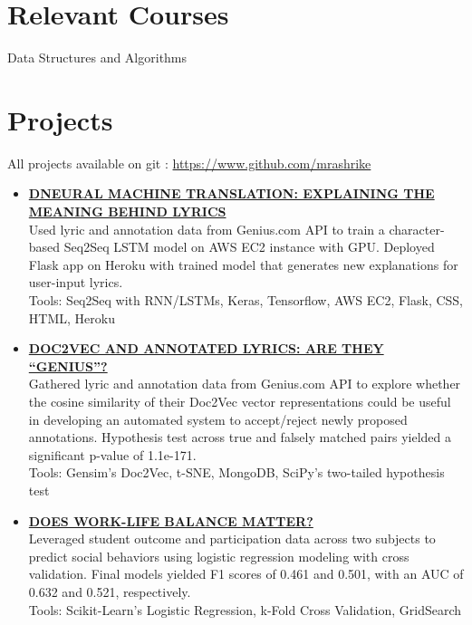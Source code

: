 \documentclass[margin, centered]{res}
\begin{document}
\begin{resume}



\section{Relevant \hspace{2mm} Courses}
Data Structures and Algorithms 

\section{Projects}
All projects available on git : \url{https://www.github.com/mrashrike}
\begin{itemize}[leftmargin=*]
 \item \textbf{\href{https://github.com/}{DNEURAL MACHINE TRANSLATION: EXPLAINING THE MEANING BEHIND LYRICS}} \\
 Used lyric and annotation data from Genius.com API to train a character-based Seq2Seq LSTM model on AWS EC2 instance with GPU. Deployed Flask app on Heroku with trained model that generates new explanations for user-input lyrics. \\
 Tools: Seq2Seq with RNN/LSTMs, Keras, Tensorflow, AWS EC2, Flask, CSS, HTML, Heroku
 \item \textbf{\href{https://github.com/}{DOC2VEC AND ANNOTATED LYRICS: ARE THEY “GENIUS”?}} \\
 Gathered lyric and annotation data from Genius.com API to explore whether the cosine similarity of their Doc2Vec vector representations could be useful in developing an automated system to accept/reject newly proposed annotations. Hypothesis test across true and falsely matched pairs yielded a significant p-value of 1.1e-171. \\
 Tools: Gensim’s Doc2Vec, t-SNE, MongoDB, SciPy’s two-tailed hypothesis test
 \item \textbf{\href{https://github.com/}{DOES WORK-LIFE BALANCE MATTER?}} \\
 Leveraged student outcome and participation data across two subjects to predict social behaviors using logistic regression modeling with cross validation. Final models yielded F1 scores of 0.461 and 0.501, with an AUC of 0.632 and 0.521, respectively. \\
 Tools: Scikit-Learn’s Logistic Regression, k-Fold Cross Validation, GridSearch 
 

\end{itemize}
\end{resume}
\end{document}
